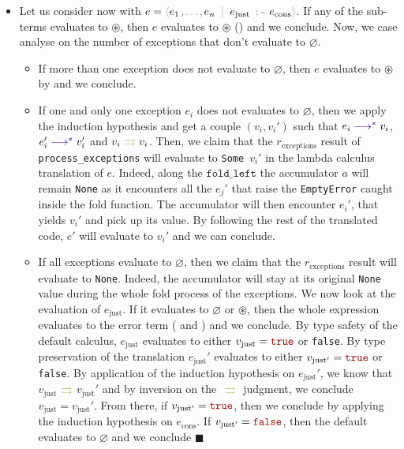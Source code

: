 \documentclass[11pt,a4paper]{article}
\newcommand{\synvar}[1]{\ensuremath{#1}}
\newcommand{\synkeyword}[1]{\textcolor{red!60!black}{\texttt{#1}}}
\newcommand{\synpunct}[1]{\textcolor{black!40!white}{\texttt{#1}}}
\newcommand{\synjust}{~\synpunct{:\raisebox{-0.9pt}{-}}~}
\newcommand{\syntrue}{\synkeyword{true}}
\newcommand{\synfalse}{\synkeyword{false}}
\newcommand{\synlangle}{\synpunct{$\langle$}}
\newcommand{\synrangle}{\synpunct{$\rangle$}}
\newcommand{\synmid}{\synpunct{~$|$~}}
\newcommand{\synemptydefault}{\synvar{\varnothing}}
\newcommand{\synerror}{\synvar{\circledast}}
\newcommand{\synellipsis}{\synpunct{,$\ldots$,}}
\newcommand{\synnone}{\texttt{None}}
\newcommand{\synsome}{\texttt{Some}~}
\newcommand{\synemptyerror}{\texttt{EmptyError}}
\newcommand{\exctx}[1]{\textcolor{blue!80!black}{\ensuremath{#1}}}
\newcommand{\exevalstar}{\exctx{\;\longrightarrow^*\;}}
\newcommand{\compctx}[1]{\textcolor{yellow!70!black}{\ensuremath{#1}}}
\newcommand{\compiles}{\ensuremath{~\compctx{\rightrightarrows}~}}
\begin{document}
\begin{itemize}
  \item Let us consider now  with $e=\synlangle\synvar{e_1}\synellipsis
  \synvar{e_n}\synmid\synvar{e_\mathrm{just}}\synjust\synvar{e_\mathrm{cons}}\synrangle$.
   If any of the sub-terms 
  evaluates to \synerror{}, then $\synvar{e}$ evaluates to $\synerror$ 
  () and we conclude. Now, we case analyse on the 
  number of exceptions that don't evaluate to \synemptydefault{}.
  \begin{itemize}
    \item If more than one exception does not evaluate to \synemptydefault{}, 
    then \synvar{e} evaluates to \synerror{} by  
    and we conclude.
    \item If one and only one exception $\synvar{e_i}$ does not evaluates to \synemptydefault{}, 
    then we apply the induction hypothesis and get a couple $(\synvar{v_i},\synvar{v_i'})$ such 
    that $\synvar{e_i}\exevalstar\synvar{v_i}$, $\synvar{e_i'}\exevalstar\synvar{v_i'}$
    and $\synvar{v_i}\compiles\synvar{v_i}$. Then, we claim that the 
    \synvar{r_\mathrm{exceptions}} result of \texttt{process\_exceptions} will 
    evaluate to \synsome\synvar{v_i'} in the lambda calculus translation of \synvar{e}.
    Indeed, along the $\texttt{fold\_left}$ the accumulator \synvar{a} will remain 
    \synnone{} as it encounters all the \synvar{e_j'} that raise the \synemptyerror{}
    caught inside the fold function. The accumulator will then encounter \synvar{e_i'},
    that yields \synvar{v_i'} and pick up its value. By following the rest of the 
    translated code, \synvar{e'} will evaluate to \synvar{v_i'} and we can 
    conclude. 
    \item If all exceptions evaluate to \synemptydefault{}, then we claim that 
    the \synvar{r_\mathrm{exceptions}} result will 
    evaluate to \synnone{}. Indeed, the accumulator will stay at its original 
    \synnone{} value during the whole fold process of the exceptions.
    We now look at the evaluation of \synvar{e_\mathrm{just}}. If it evaluates 
    to \synemptydefault{} or \synerror{}, then the whole expression evaluates
    to the error term ( and ) 
    and we conclude. By type safety of the default calculus, \synvar{e_\mathrm{just}} 
    evaluates to either $\synvar{v_\mathrm{just}} =\syntrue{}$ or \synfalse{}. By type preservation of the 
    translation \synvar{e_\mathrm{just}'} evaluates to 
    either $\synvar{v_\mathrm{just'}} =\syntrue{}$ or \synfalse{}. By application of the induction hypothesis 
    on \synvar{e_\mathrm{just}'}, we know that 
    \synvar{v_\mathrm{just}}\compiles\synvar{v_\mathrm{just}'} and by 
    inversion on the \compiles{} judgment, we conclude $\synvar{v_\mathrm{just}}=\synvar{v_\mathrm{just}'}$.
    From there, if $\synvar{v_\mathrm{just'}} =\syntrue{}$, then we conclude 
    by applying the induction hypothesis on \synvar{e_\mathrm{cons}}. If 
    $\synvar{v_\mathrm{just'}} =\synfalse{}$, then the default evaluates to 
    \synemptydefault{} and we conclude $\blacksquare$
  \end{itemize}
\end{itemize}
\end{document}
